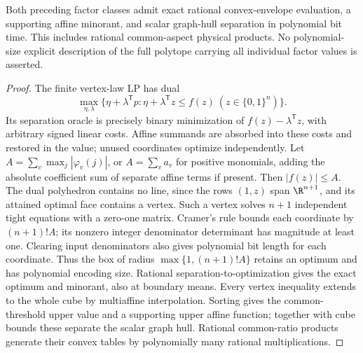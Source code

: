\begin{corollary}
\label{cor:scalar-envelope-algorithm}
Both preceding factor classes admit exact rational convex-envelope
evaluation, a supporting affine minorant, and scalar graph-hull
separation in polynomial bit time. This includes rational common-aspect
physical products. No polynomial-size explicit description of the full
polytope carrying all individual factor values is asserted.
\end{corollary}
\begin{proof}
The finite vertex-law LP has dual
\[
 \max_{\eta,\lambda}\{\eta+\lambda^{\mathsf T}p:
                 \eta+\lambda^{\mathsf T}z\le f(z)\ (z\in\{0,1\}^n)\}.
\]
Its separation oracle is precisely binary minimization of
$f(z)-\lambda^{\mathsf T}z$, with arbitrary signed linear costs.
Affine summands are absorbed into these costs and restored in the
value; unused coordinates optimize independently. Let
$A=\sum_v\max_j|\varphi_v(j)|$, or $A=\sum_va_v$ for positive monomials,
adding the absolute coefficient sum of separate affine terms if present.
Then $|f(z)|\le A$. The dual polyhedron contains no line, since the rows
$(1,z)$ span $\R^{n+1}$, and its attained optimal face contains a vertex.
Such a vertex solves $n+1$ independent tight equations with a zero-one
matrix. Cramer's rule bounds each coordinate by $(n+1)!A$; its nonzero
integer denominator determinant has magnitude at least one. Clearing
input denominators also gives polynomial bit length for each coordinate.
Thus the box of radius $\max\{1,(n+1)!A\}$ retains an optimum and has
polynomial encoding size. Rational separation-to-optimization
\citep[Theorem~6.4.9]{GLS1988} gives the exact optimum and minorant, also at boundary
means. Every vertex inequality extends to the whole cube by multiaffine
interpolation. Sorting gives the common-threshold upper value and a
supporting upper affine function; together with cube bounds these
separate the scalar graph hull. Rational common-ratio products generate
their convex tables by polynomially many rational multiplications.
\end{proof}
